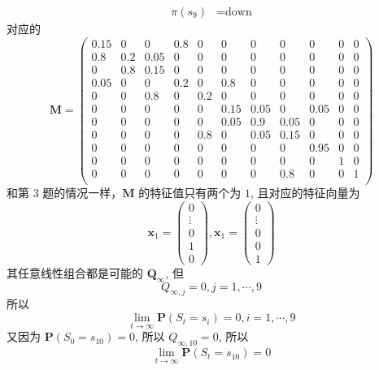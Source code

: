 \documentclass[11pt,letter,notitlepage]{article}
\begin{document}
\begin{solution}
\begin{enumerate}
$$\begin{aligned}
				      \pi(s_9) & = \text{down}
			      \end{aligned}$$
		      对应的
		      $$\mathbf{M}=\begin{pmatrix}
				      0.15 & 0   & 0    & 0.8 & 0   & 0    & 0    & 0    & 0    & 0 & 0 \\
				      0.8  & 0.2 & 0.05 & 0   & 0   & 0    & 0    & 0    & 0    & 0 & 0 \\
				      0    & 0.8 & 0.15 & 0   & 0   & 0    & 0    & 0    & 0    & 0 & 0 \\
				      0.05 & 0   & 0    & 0.2 & 0   & 0.8  & 0    & 0    & 0    & 0 & 0 \\
				      0    & 0   & 0.8  & 0   & 0.2 & 0    & 0    & 0    & 0    & 0 & 0 \\
				      0    & 0   & 0    & 0   & 0   & 0.15 & 0.05 & 0    & 0.05 & 0 & 0 \\
				      0    & 0   & 0    & 0   & 0   & 0.05 & 0.9  & 0.05 & 0    & 0 & 0 \\
				      0    & 0   & 0    & 0   & 0.8 & 0    & 0.05 & 0.15 & 0    & 0 & 0 \\
				      0    & 0   & 0    & 0   & 0   & 0    & 0    & 0    & 0.95 & 0 & 0 \\
				      0    & 0   & 0    & 0   & 0   & 0    & 0    & 0    & 0    & 1 & 0 \\
				      0    & 0   & 0    & 0   & 0   & 0    & 0    & 0.8  & 0    & 0 & 1 \\
			      \end{pmatrix}$$
		      和第 3 题的情况一样，$\mathbf{M}$ 的特征值只有两个为 $1$, 且对应的特征向量为
		      $$\mathbf{x}_1=\begin{pmatrix}
				      0 \\ \vdots\\0\\1\\0
			      \end{pmatrix}, \mathbf{x}_1=\begin{pmatrix}
				      0 \\ \vdots\\0\\0\\1
			      \end{pmatrix}$$
		      其任意线性组合都是可能的 $\mathbf{Q}_\infty$, 但
		      $$Q_{\infty,j}=0, j=1,\cdots,9$$
		      所以 $$\lim_{t\rightarrow\infty} \mathbf{P}(S_t=s_i)=0,i=1,\cdots,9$$
		      又因为 $\mathbf{P}(S_0=s_{10})=0$, 所以 $Q_{\infty,10}=0$, 所以
		      $$\lim_{t\rightarrow\infty} \mathbf{P}(S_t=s_{10})=0$$
	\end{enumerate}
\end{solution}
\end{document}
